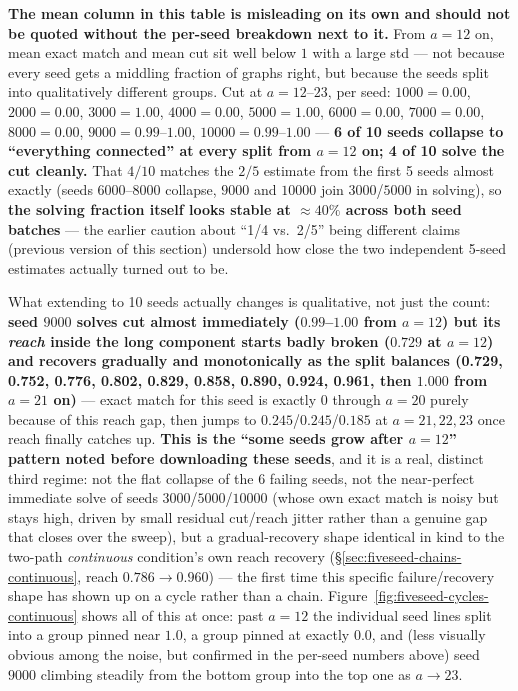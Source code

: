 \documentclass[11pt,a4paper]{article}
\begin{document}
\textbf{The mean column in this table is misleading on its own and should not be quoted
without the per-seed breakdown next to it.} From $a{=}12$ on, mean exact match and mean cut
sit well below $1$ with a large std --- not because every seed gets a middling fraction of
graphs right, but because the seeds split into qualitatively different groups. Cut at
$a{=}12$--$23$, per seed: $1000{=}0.00$, $2000{=}0.00$, $3000{=}\mathbf{1.00}$, $4000{=}0.00$,
$5000{=}\mathbf{1.00}$, $6000{=}0.00$, $7000{=}0.00$, $8000{=}0.00$,
$9000{=}0.99\text{--}1.00$, $10000{=}0.99\text{--}1.00$ --- \textbf{6 of 10 seeds collapse to
``everything connected'' at every split from $a{=}12$ on; 4 of 10 solve the cut cleanly.} That
$4/10$ matches the $2/5$ estimate from the first 5 seeds almost exactly (seeds $6000$--$8000$
collapse, $9000$ and $10000$ join $3000$/$5000$ in solving), so \textbf{the solving fraction
itself looks stable at $\approx40\%$ across both seed batches} --- the earlier caution about
``1/4 vs.\ 2/5'' being different claims (previous version of this section) undersold how
close the two independent 5-seed estimates actually turned out to be.

What extending to 10 seeds actually changes is qualitative, not just the count: \textbf{seed
$9000$ solves cut almost immediately ($0.99$--$1.00$ from $a{=}12$) but its \emph{reach}
inside the long component starts badly broken ($0.729$ at $a{=}12$) and recovers gradually
and monotonically as the split balances (0.729, 0.752, 0.776, 0.802, 0.829, 0.858, 0.890,
0.924, 0.961, then $1.000$ from $a{=}21$ on)} --- exact match for this seed is exactly $0$
through $a{=}20$ purely because of this reach gap, then jumps to $0.245$/$0.245$/$0.185$ at
$a{=}21,22,23$ once reach finally catches up. \textbf{This is the ``some seeds grow after
$a{=}12$'' pattern noted before downloading these seeds}, and it is a real, distinct third
regime: not the flat collapse of the 6 failing seeds, not the near-perfect immediate solve of
seeds $3000$/$5000$/$10000$ (whose own exact match is noisy but stays high, driven by small
residual cut/reach jitter rather than a genuine gap that closes over the sweep), but a
gradual-recovery shape identical in kind to the two-path \emph{continuous} condition's own
reach recovery (\S\ref{sec:fiveseed-chains-continuous}, reach $0.786\to0.960$) --- the first
time this specific failure/recovery shape has shown up on a cycle rather than a chain.
Figure~\ref{fig:fiveseed-cycles-continuous} shows all of this at once: past $a{=}12$ the
individual seed lines split into a group pinned near $1.0$, a group pinned at exactly $0.0$,
and (less visually obvious among the noise, but confirmed in the per-seed numbers above) seed
$9000$ climbing steadily from the bottom group into the top one as $a\to23$.
\end{document}

